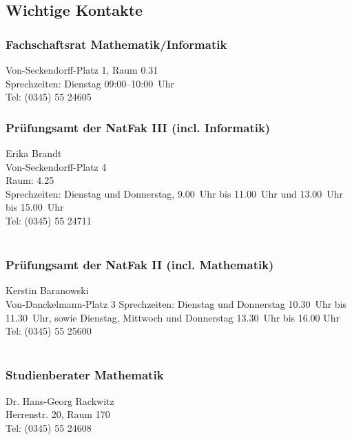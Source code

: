 \subsection{Wichtige Kontakte}

\subsubsection{Fachschaftsrat Mathematik/Informatik}
Von-Seckendorff-Platz 1, Raum 0.31\\
Sprechzeiten: Dienstag 09:00--10:00~Uhr\\
Tel: (0345) 55 24605\\

\subsubsection{Prüfungsamt der NatFak III (incl. Informatik)}
Erika Brandt\\
Von-Seckendorff-Platz 4\\
Raum: 4.25\\
Sprechzeiten: Dienstag und Donnerstag, 9.00~Uhr bis 11.00~Uhr und
13.00~Uhr bis 15.00~Uhr\\
Tel: (0345) 55 24711\\
\\

\subsubsection{Prüfungsamt der NatFak II (incl. Mathematik)}
Kerstin Baranowski\\
Von-Danckelmann-Platz 3
Sprechzeiten: Dienstag und Donnerstag 10.30~Uhr bis 11.30~Uhr, sowie
Dienstag, Mittwoch und Donnerstag 13.30~Uhr bis 16.00 Uhr\\
Tel: (0345) 55 25600\\
\\

\subsubsection{Studienberater Mathematik}
Dr. Hans-Georg Rackwitz\\
Herrenstr. 20, Raum 170\\
Tel: (0345) 55 24608\\
\\


